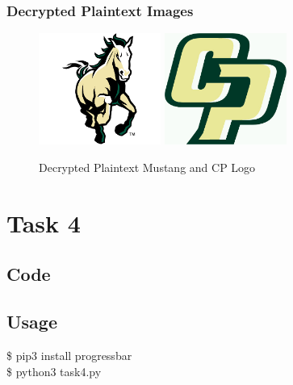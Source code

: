 \documentclass[11pt]{article}
\begin{document}
  \subsubsection{Decrypted Plaintext Images}
    \begin{figure}[!h]
      \centering
      \includegraphics[width=4cm]{Images/mustang.jpg}
      \includegraphics[width=4cm]{Images/cp-logo.jpg}
      \caption{Decrypted Plaintext Mustang and CP Logo}
      \label{fig:Decrypted_Plaintext_Images}
    \end{figure}

\section{Task 4}
  \subsection{Code}
    
  \subsection{Usage}
    {\tt\begin{tabbing}                                                                                                                                                                     
      \$ pip3 install progressbar\\
      \$ python3 task4.py\\
      \end{tabbing}}

  \pagebreak
\end{document}
